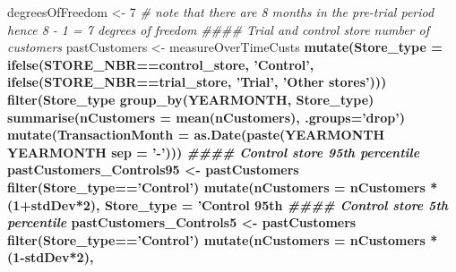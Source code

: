 \documentclass[]{article}
\newenvironment{Shaded}{\begin{snugshade}}{\end{snugshade}}
\newcommand{\CommentTok}[1]{\textcolor[rgb]{0.56,0.35,0.01}{\textit{#1}}}
\newcommand{\DataTypeTok}[1]{\textcolor[rgb]{0.13,0.29,0.53}{#1}}
\newcommand{\DecValTok}[1]{\textcolor[rgb]{0.00,0.00,0.81}{#1}}
\newcommand{\KeywordTok}[1]{\textcolor[rgb]{0.13,0.29,0.53}{\textbf{#1}}}
\newcommand{\NormalTok}[1]{#1}
\newcommand{\OperatorTok}[1]{\textcolor[rgb]{0.81,0.36,0.00}{\textbf{#1}}}
\newcommand{\StringTok}[1]{\textcolor[rgb]{0.31,0.60,0.02}{#1}}
\begin{document}
\begin{Shaded}
\begin{Highlighting}[]
\NormalTok{degreesOfFreedom <-}\StringTok{ }\DecValTok{7} \CommentTok{# note that there are 8 months in the pre-trial period hence 8 - 1 = 7 degrees of freedom}
\CommentTok{#### Trial and control store number of customers}
\NormalTok{pastCustomers <-}\StringTok{ }\NormalTok{measureOverTimeCusts }\OperatorTok{%
\StringTok{  }\KeywordTok{mutate}\NormalTok{(}\DataTypeTok{Store_type =} \KeywordTok{ifelse}\NormalTok{(STORE_NBR}\OperatorTok{==}\NormalTok{control_store, }\StringTok{'Control'}\NormalTok{,}
                             \KeywordTok{ifelse}\NormalTok{(STORE_NBR}\OperatorTok{==}\NormalTok{trial_store, }\StringTok{'Trial'}\NormalTok{,}
                                    \StringTok{'Other stores'}\NormalTok{))) }\OperatorTok{%
\StringTok{  }\KeywordTok{filter}\NormalTok{(Store_type }\OperatorTok{%
\StringTok{  }\KeywordTok{group_by}\NormalTok{(YEARMONTH, Store_type) }\OperatorTok{%
\StringTok{  }\KeywordTok{summarise}\NormalTok{(}\DataTypeTok{nCustomers =} \KeywordTok{mean}\NormalTok{(nCustomers), }\DataTypeTok{.groups=}\StringTok{'drop'}\NormalTok{) }\OperatorTok{%
\StringTok{  }\KeywordTok{mutate}\NormalTok{(}\DataTypeTok{TransactionMonth =} \KeywordTok{as.Date}\NormalTok{(}\KeywordTok{paste}\NormalTok{(YEARMONTH }\OperatorTok{%
\NormalTok{                                          YEARMONTH }\OperatorTok{%
                                          \DataTypeTok{sep =} \StringTok{'-'}\NormalTok{)))}
\CommentTok{#### Control store 95th percentile}
\NormalTok{pastCustomers_Controls95 <-}\StringTok{ }\NormalTok{pastCustomers }\OperatorTok{%
\StringTok{  }\KeywordTok{filter}\NormalTok{(Store_type}\OperatorTok{==}\StringTok{'Control'}\NormalTok{) }\OperatorTok{%
\StringTok{  }\KeywordTok{mutate}\NormalTok{(}\DataTypeTok{nCustomers =}\NormalTok{ nCustomers }\OperatorTok{*}\StringTok{ }\NormalTok{(}\DecValTok{1}\OperatorTok{+}\NormalTok{stdDev}\OperatorTok{*}\DecValTok{2}\NormalTok{),}
         \DataTypeTok{Store_type =} \StringTok{'Control 95th %
\CommentTok{#### Control store 5th percentile}
\NormalTok{pastCustomers_Controls5 <-}\StringTok{ }\NormalTok{pastCustomers }\OperatorTok{%
\StringTok{  }\KeywordTok{filter}\NormalTok{(Store_type}\OperatorTok{==}\StringTok{'Control'}\NormalTok{) }\OperatorTok{%
\StringTok{  }\KeywordTok{mutate}\NormalTok{(}\DataTypeTok{nCustomers =}\NormalTok{ nCustomers }\OperatorTok{*}\StringTok{ }\NormalTok{(}\DecValTok{1}\OperatorTok{-}\NormalTok{stdDev}\OperatorTok{*}\DecValTok{2}\NormalTok{),}
}}}}}}}}}}}}
\end{Highlighting}
\end{Shaded}
\end{document}
